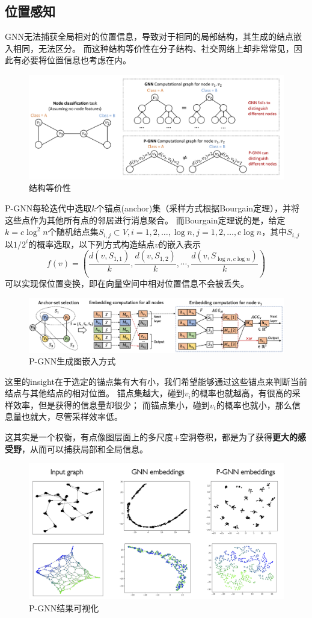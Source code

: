 \documentclass[reportComp]{thesis}
\begin{document}
\subsection{位置感知}
GNN无法捕获全局相对的位置信息，导致对于相同的局部结构，其生成的结点嵌入相同，无法区分。
而这种结构等价性在分子结构、社交网络上却非常常见，因此有必要将位置信息也考虑在内。
\begin{figure}[H]
\centering
\includegraphics[width=0.8\linewidth]{fig/pgnn-example.png}
\caption{结构等价性}
\end{figure}

P-GNN每轮迭代中选取$k$个锚点(anchor)集（采样方式根据Bourgain定理），并将这些点作为其他所有点的邻居进行消息聚合。
而Bourgain定理说的是，给定$k=c\log^2n$个随机结点集$S_{i,j}\subset V,i=1,2,\ldots,\log n,j=1,2,\ldots,c\log n$，其中$S_{i,j}$以$1/2^i$的概率选取，以下列方式构造结点$v$的嵌入表示
\[f(v)=\left(\frac{d(v,S_{1,1})}{k},\frac{d(v,S_{1,2})}{k},\cdots,\frac{d(v,S_{\log n,c\log n})}{k}\right)\]
可以实现保位置变换，即在向量空间中相对位置信息不会被丢失。
\begin{figure}[H]
\centering
\includegraphics[width=0.8\linewidth]{fig/PGNN.png}
\caption{P-GNN生成图嵌入方式}
\end{figure}

这里的insight在于选定的锚点集有大有小，我们希望能够通过这些锚点来判断当前结点与其他结点的相对位置。
锚点集越大，碰到$v_i$的概率也就越高，有很高的采样效率，但是获得的信息量却很少；
而锚点集小，碰到$v_i$的概率也就小，那么信息量也就大，尽管采样效率低。

这其实是一个权衡，有点像图层面上的多尺度+空洞卷积，都是为了获得\textbf{更大的感受野}，从而可以捕获局部和全局信息。
\begin{figure}[H]
\centering
\includegraphics[width=0.8\linewidth]{fig/PGNN_results.png}
\caption{P-GNN结果可视化}
\end{figure}
\end{document}
